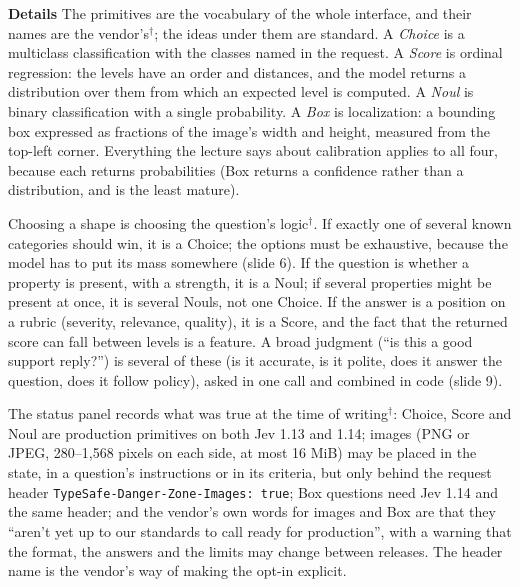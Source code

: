 \documentclass[11pt,letterpaper]{article}
\newcommand{\para}[1]{\medskip\noindent\textbf{#1}\quad}
\begin{document}
\para{Details} The primitives are the vocabulary of the whole interface, and their names are the vendor's$^\dagger$; the ideas under them are standard. A \emph{Choice} is a multiclass classification with the classes named in the request. A \emph{Score} is ordinal regression: the levels have an order and distances, and the model returns a distribution over them from which an expected level is computed. A \emph{Noul} is binary classification with a single probability. A \emph{Box} is localization: a bounding box expressed as fractions of the image's width and height, measured from the top-left corner. Everything the lecture says about calibration applies to all four, because each returns probabilities (Box returns a confidence rather than a distribution, and is the least mature).

Choosing a shape is choosing the question's logic$^\dagger$. If exactly one of several known categories should win, it is a Choice; the options must be exhaustive, because the model has to put its mass somewhere (slide 6). If the question is whether a property is present, with a strength, it is a Noul; if several properties might be present at once, it is several Nouls, not one Choice. If the answer is a position on a rubric (severity, relevance, quality), it is a Score, and the fact that the returned score can fall between levels is a feature. A broad judgment (``is this a good support reply?'') is several of these (is it accurate, is it polite, does it answer the question, does it follow policy), asked in one call and combined in code (slide 9).

The status panel records what was true at the time of writing$^\dagger$: Choice, Score and Noul are production primitives on both Jev 1.13 and 1.14; images (PNG or JPEG, 280--1,568 pixels on each side, at most 16 MiB) may be placed in the state, in a question's instructions or in its criteria, but only behind the request header \texttt{TypeSafe-Danger-Zone-Images: true}; Box questions need Jev 1.14 and the same header; and the vendor's own words for images and Box are that they ``aren't yet up to our standards to call ready for production'', with a warning that the format, the answers and the limits may change between releases. The header name is the vendor's way of making the opt-in explicit.
\end{document}
